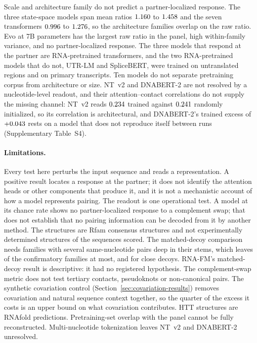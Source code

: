 \documentclass[11pt]{article}
\begin{document}
Scale and architecture family do not predict a partner-localized response. The
three state-space models span mean ratios $1.160{}$ to $1.458{}$
and the seven transformers $0.996{}$ to $1.276{}$, so the
architecture families overlap on the raw ratio. Evo at 7B
parameters has the largest raw ratio in the panel, high within-family variance,
and no partner-localized response. The three models that respond at the partner
are RNA-pretrained transformers, and the two RNA-pretrained models that do not,
UTR-LM and SpliceBERT, were trained on untranslated regions and on primary
transcripts. Ten models do not separate pretraining corpus from architecture or
size. NT~v2 and DNABERT-2 are not resolved by a nucleotide-level readout, and
their attention--contact correlations do not supply the missing channel: NT~v2
reads $0.234{}$ trained against $0.241{}$ randomly
initialized, so its correlation is architectural, and DNABERT-2's trained
excess of $+0.043{}$ rests on a model that does not reproduce
itself between runs (Supplementary Table~S4).

\paragraph{Limitations.}
Every test here perturbs the input sequence and reads a representation. A
positive result locates a response at the partner; it does not identify the
attention heads or other components that produce it, and it is not a
mechanistic account of how a model represents pairing. The readout is one
operational test. A model at its chance rate shows no
partner-localized response to a complement swap; that does not establish that
no pairing information can be decoded from it by another method. The
structures are Rfam consensus structures and not experimentally determined
structures of the sequences scored. The matched-decoy comparison needs
families with several same-nucleotide pairs deep in their stems, which leaves
\decoyAllFamiliesErnieRNA{} of the \confirmatoryN{} confirmatory families at
most, and \decoyCloseFamiliesErnieRNA{} for close decoys. RNA-FM's
matched-decoy result is descriptive: it had no registered hypothesis. The
complement-swap metric does not test tertiary contacts, pseudoknots or
non-canonical pairs. The synthetic covariation control
(Section~\ref{sec:covariation-results}) removes covariation and natural
sequence context together, so the quarter of the excess it costs is an upper
bound on what covariation contributes. HTT structures are RNAfold predictions.
Pretraining-set overlap with the panel cannot be fully reconstructed.
Multi-nucleotide tokenization leaves NT~v2 and DNABERT-2 unresolved.
\end{document}
